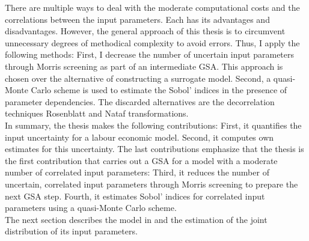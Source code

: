 There are multiple ways to deal with the moderate computational costs and the correlations between the input parameters. Each has its advantages and disadvantages. However, the general approach of this thesis is to circumvent unnecessary degrees of methodical complexity to avoid errors. Thus, I apply the following methods: First, I decrease the number of uncertain input parameters through Morris screening as part of an intermediate GSA. This approach is chosen over the alternative of constructing a surrogate model.
Second, a quasi-Monte Carlo scheme is used to estimate the Sobol' indices in the presence of parameter dependencies. The discarded alternatives are the decorrelation techniques Rosenblatt and Nataf transformations.\\
\newline
In summary, the thesis makes the following contributions: First, it quantifies the input uncertainty for a labour economic model. Second, it computes own estimates for this uncertainty. The last contributions emphasize that the thesis is the first contribution that carries out a GSA for a model with a moderate number of correlated input parameters: Third, it reduces the number of uncertain, correlated input parameters through Morris screening to prepare the next GSA step. Fourth, it estimates Sobol' indices for correlated input parameters using a quasi-Monte Carlo scheme.\\
\newline
The next section describes the model in \cite{Keane.1994} and the estimation of the joint distribution of its input parameters.
